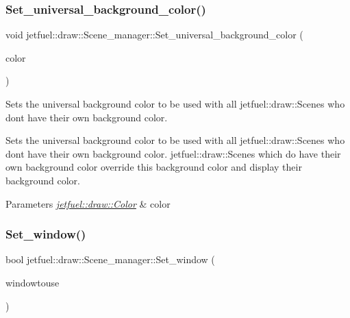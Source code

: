 \subsubsection{\texorpdfstring{Set\+\_\+universal\+\_\+background\+\_\+color()}{Set\_universal\_background\_color()}}
{\footnotesize\ttfamily void jetfuel\+::draw\+::\+Scene\+\_\+manager\+::\+Set\+\_\+universal\+\_\+background\+\_\+color (\begin{DoxyParamCaption}\item[{\hyperlink{classjetfuel_1_1draw_1_1Color}{Color}}]{color }\end{DoxyParamCaption})\hspace{0.3cm}{\ttfamily [inline]}}



Sets the universal background color to be used with all jetfuel\+::draw\+::\+Scenes who don\textquotesingle{}t have their own background color. 

Sets the universal background color to be used with all jetfuel\+::draw\+::\+Scenes who don\textquotesingle{}t have their own background color. jetfuel\+::draw\+::\+Scenes which do have their own background color override this background color and display their background color.


\begin{DoxyParams}{Parameters}
{\em \hyperlink{classjetfuel_1_1draw_1_1Color}{jetfuel\+::draw\+::\+Color}} & color \\
\hline
\end{DoxyParams}
\mbox{\label{classjetfuel_1_1draw_1_1Scene__manager_a3a13d30af1a38eddd47c4959062b3d9b}} 
\subsubsection{\texorpdfstring{Set\+\_\+window()}{Set\_window()}}
{\footnotesize\ttfamily bool jetfuel\+::draw\+::\+Scene\+\_\+manager\+::\+Set\+\_\+window (\begin{DoxyParamCaption}\item[{S\+D\+L\+\_\+\+Window $\ast$}]{windowtouse }\end{DoxyParamCaption})}



